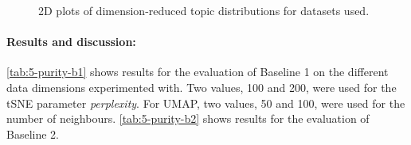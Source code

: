 \begin{figure}[htp]
    \ContinuedFloat \centering


    \centering
    \caption{2D plots of dimension-reduced topic distributions for datasets used.}
    \label{fig:5-2D-plot}
\end{figure}
\FloatBarrier

\paragraph{Results and discussion:} \autoref{tab:5-purity-b1} shows results for the evaluation of Baseline 1 on the different data dimensions experimented with. Two values, 100 and 200, were used for the \ac{tSNE} parameter \emph{perplexity}. For \ac{UMAP}, two values, 50 and 100, were used for the number of neighbours. \autoref{tab:5-purity-b2} shows results for the evaluation of Baseline 2.


